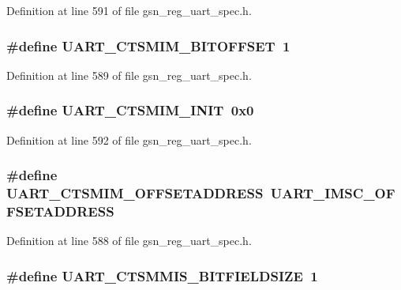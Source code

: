 Definition at line 591 of file gsn\_\-reg\_\-uart\_\-spec.h.

\hypertarget{a00575_a3058d63c987a4de600b944774d163b95}{
\subsubsection[{UART\_\-CTSMIM\_\-BITOFFSET}]{\setlength{\rightskip}{0pt plus 5cm}\#define UART\_\-CTSMIM\_\-BITOFFSET~1}}
\label{a00575_a3058d63c987a4de600b944774d163b95}


Definition at line 589 of file gsn\_\-reg\_\-uart\_\-spec.h.

\hypertarget{a00575_a67b08e7711210e9f10ee00e81bf823d1}{
\subsubsection[{UART\_\-CTSMIM\_\-INIT}]{\setlength{\rightskip}{0pt plus 5cm}\#define UART\_\-CTSMIM\_\-INIT~0x0}}
\label{a00575_a67b08e7711210e9f10ee00e81bf823d1}


Definition at line 592 of file gsn\_\-reg\_\-uart\_\-spec.h.

\hypertarget{a00575_a40bb9b77b52254d38e0392591c7be707}{
\subsubsection[{UART\_\-CTSMIM\_\-OFFSETADDRESS}]{\setlength{\rightskip}{0pt plus 5cm}\#define UART\_\-CTSMIM\_\-OFFSETADDRESS~UART\_\-IMSC\_\-OFFSETADDRESS}}
\label{a00575_a40bb9b77b52254d38e0392591c7be707}


Definition at line 588 of file gsn\_\-reg\_\-uart\_\-spec.h.

\hypertarget{a00575_a8566176a4faf7d52e3825aeddf5a7c4c}{
\subsubsection[{UART\_\-CTSMMIS\_\-BITFIELDSIZE}]{\setlength{\rightskip}{0pt plus 5cm}\#define UART\_\-CTSMMIS\_\-BITFIELDSIZE~1}}
\label{a00575_a8566176a4faf7d52e3825aeddf5a7c4c}


